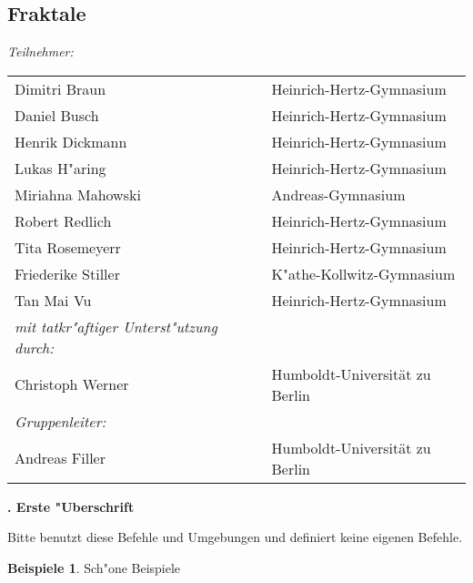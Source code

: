 \documentclass[10pt,a4paper, twoside]{article}
\newcounter{oursec}
\renewcommand*\theoursec{\arabic{oursec}. }
\newcommand{\oursec}[1]{\vspace{4ex}\stepcounter{oursec}%
{\Large\bf\theoursec #1\\[2ex]}}
\theoremstyle{definition}
\newtheorem*{Beispiele}{Beispiele}
\theoremstyle{plain}
\numberwithin{equation}{subsection}
\begin{document}
\subsection*{Fraktale}

\setcounter{Beispiel}{0}
\setcounter{equation}{0}

\setcounter{Satz}{0}
\setcounter{Lemma}{0}
\setcounter{Korollar}{0}
\setcounter{Definition}{0}
\setcounter{Bemerkung}{0}
\setcounter{oursec}{0}


\vspace{0,5cm}
\textit{Teilnehmer:}

\begin{tabular}{lp{3mm}l}
Dimitri Braun&&Heinrich-Hertz-Gymnasium\\
Daniel Busch&& Heinrich-Hertz-Gymnasium\\
Henrik Dickmann&&Heinrich-Hertz-Gymnasium\\
Lukas H"aring&&Heinrich-Hertz-Gymnasium\\
Miriahna Mahowski&&Andreas-Gymnasium\\
Robert Redlich&&Heinrich-Hertz-Gymnasium\\
Tita Rosemeyerr&&Heinrich-Hertz-Gymnasium\\
Friederike Stiller&&K"athe-Kollwitz-Gymnasium\\
Tan Mai Vu&& Heinrich-Hertz-Gymnasium\\
[0,3cm]

\textit{mit tatkr"aftiger Unterst"utzung durch:}\\

Christoph Werner&&Humboldt-Universit\"at zu Berlin\\[0,3cm]

\textit{Gruppenleiter:}\\


Andreas Filler&& Humboldt-Universit\"at zu Berlin\\

\end{tabular}
\begin{center}
\end{center}

\pagebreak


\oursec{Erste "Uberschrift}

Bitte benutzt diese Befehle und Umgebungen und definiert keine eigenen Befehle. 

\begin{Beispiele}
Sch"one Beispiele
\end{Beispiele}
\end{document}
